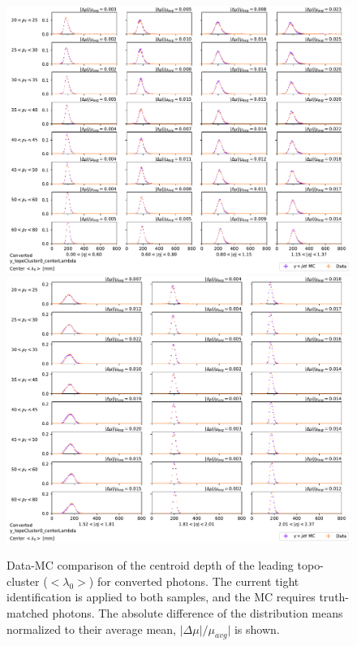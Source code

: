 \begin{figure}[!thp]
    \centering
    \includegraphics[width=.74\textwidth]{appendices/datamc_images/y_topoCluster0_centerLambda_Converted_lowerEta.pdf}
    \includegraphics[width=.74\textwidth]{appendices/datamc_images/y_topoCluster0_centerLambda_Converted_upperEta.pdf}
    \caption[Data-MC comparison of the centroid depth of the leading topo-cluster ($<\lambda_{0}>$) for converted photons]{Data-MC comparison of the centroid depth of the leading topo-cluster ($<\lambda_{0}>$) for converted photons. The current tight identification is applied to both samples, and the \gls{MC} requires truth-matched photons. The absolute difference of the distribution means normalized to their average mean, $|\Delta \mu|/\mu_{avg}|$ is shown.}
    \label{fig:dmc-c-cl}
\end{figure}


